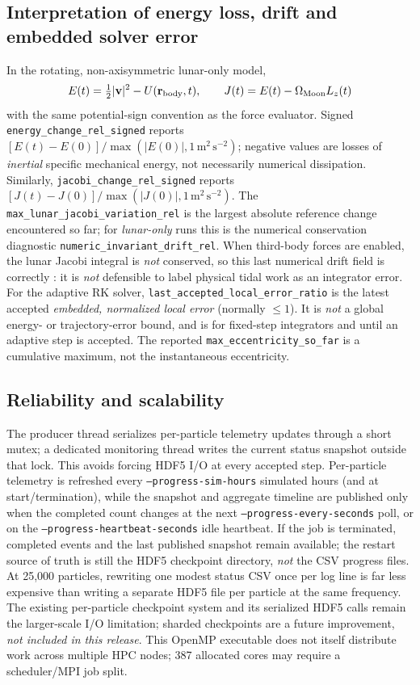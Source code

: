 \documentclass[11pt,a4paper]{article}
\newcommand{\opt}[1]{\texttt{#1}}
\newcommand{\pathcode}[1]{\nolinkurl{#1}}
\newcommand{\kbd}[1]{\texttt{\detokenize{#1}}}
\begin{document}
\subsection{Interpretation of energy loss, drift and embedded solver error}
In the rotating, non-axisymmetric lunar-only model,
\begin{equation}
 E(t)=\tfrac12|\mathbf v|^2-U(\mathbf r_{\rm body},t),\qquad
 J(t)=E(t)-\Omega_{\rm Moon}L_z(t)
\end{equation}
with the same potential-sign convention as the force evaluator.
Signed \pathcode{energy_change_rel_signed} reports
$[E(t)-E(0)]/\max(|E(0)|,1\,\mathrm{m^2\,s^{-2}})$;
negative values are losses of \emph{inertial} specific mechanical energy,
not necessarily numerical dissipation. Similarly,
\pathcode{jacobi_change_rel_signed} reports
$[J(t)-J(0)]/\max(|J(0)|,1\,\mathrm{m^2\,s^{-2}})$.
The \pathcode{max_lunar_jacobi_variation_rel} is the largest absolute
reference change encountered so far; for \emph{lunar-only} runs this is the
numerical conservation diagnostic
\pathcode{numeric_invariant_drift_rel}.
When third-body forces are enabled, the lunar Jacobi integral is \emph{not}
conserved, so this last numerical drift field is correctly \kbd{nan}: it is
\emph{not} defensible to label physical tidal work as an integrator error.
For the adaptive RK solver, \pathcode{last_accepted_local_error_ratio}
is the latest accepted \emph{embedded, normalized local error} (normally
$\le1$). It is \emph{not} a global energy- or trajectory-error bound, and is
\kbd{nan} for fixed-step integrators and until an adaptive step is accepted.
The reported \pathcode{max_eccentricity_so_far} is a cumulative maximum,
not the instantaneous eccentricity.

\subsection{Reliability and scalability}
The producer thread serializes per-particle telemetry updates through a
short mutex; a dedicated monitoring thread writes the current status snapshot
outside that lock. This avoids forcing HDF5 I/O at every accepted step.
Per-particle telemetry is refreshed every
\opt{--progress-sim-hours} simulated hours (and at start/termination), while
the snapshot and aggregate timeline are published only when the completed count
changes at the next \opt{--progress-every-seconds} poll, or on the
\opt{--progress-heartbeat-seconds} idle heartbeat. If the job is terminated,
completed events and the last published snapshot remain available; the
restart source of truth is still the HDF5 checkpoint directory, \emph{not}
the CSV progress files. At 25,000 particles, rewriting one modest status
CSV once per log line is far less expensive than writing a separate HDF5 file
per particle at the same frequency. The existing per-particle checkpoint
system and its serialized HDF5 calls remain the larger-scale I/O limitation;
sharded checkpoints are a future improvement, \emph{not included in this
release}. This OpenMP executable does not itself distribute work across
multiple HPC nodes; 387 allocated cores may require a scheduler/MPI job split.
\end{document}
